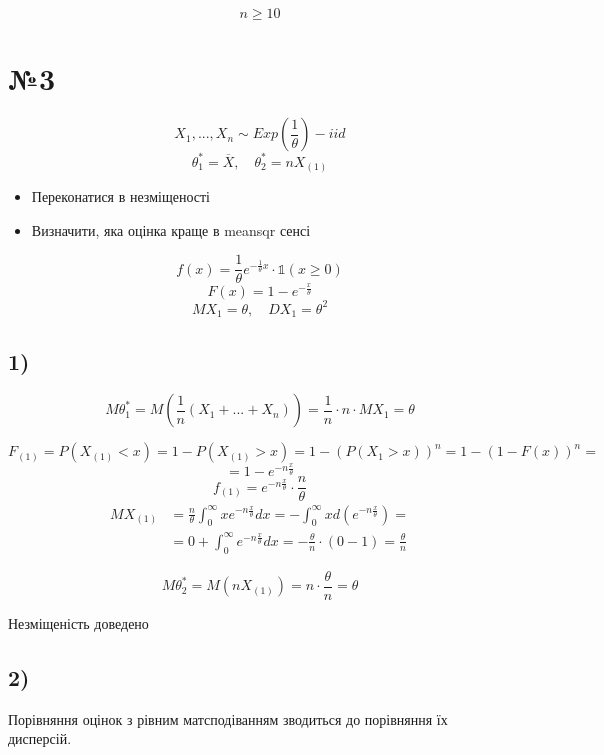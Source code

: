 \documentclass[11pt, a4paper]{article} %
\begin{document}
\begin{mdframed}[style=ans]
    $$n \ge 10$$
\end{mdframed}

\section*{№3}
\begin{mdframed}
    $$X_1,...,X_n \sim Exp\left(\frac{1}{\theta}\right) - iid$$
    $$\theta^*_1 = \overline X, \quad \theta^*_2 = nX_{(1)}$$

    \begin{itemize}
        \item Переконатися в незміщеності
        \item Визначити, яка оцінка краще в meansqr сенсі
    \end{itemize}
\end{mdframed}

$$f(x) = \frac{1}{\theta}e^{-\frac{1}{\theta}x} \cdot \mathbb{1}(x \ge 0)$$
$$F(x) = 1 - e^{-\frac{x}{\theta}}$$
$$MX_1 = \theta, \quad DX_1 = \theta^2$$

\subsection*{1)}
$$M\theta^*_1 = M\left(\frac{1}{n} (X_1 + ... + X_n)\right) = \frac{1}{n} \cdot n \cdot MX_1 = \theta$$

$$F_{(1)} = P(X_{(1)} < x) = 1 - P(X_{(1)} > x) = 1 - \left(P(X_1 > x)\right)^n = 1 - \left(1 - F(x)\right)^n =$$
$$= 1 - e^{-n\frac{x}{\theta}}$$
$$f_{(1)} = e^{-n\frac{x}{\theta}} \cdot \frac{n}{\theta}$$
\begin{align*}    
MX_{(1)} &= \frac{n}{\theta} \int_0^\infty x e^{-n\frac{x}{\theta}} dx 
=  -\int_0^\infty x d\left(e^{-n\frac{x}{\theta}}\right) = \\
&= 0 + \int_0^\infty e^{-n\frac{x}{\theta}} dx 
= -\frac{\theta}{n} \cdot (0-1) = \frac{\theta}{n}
\end{align*}

$$M\theta^*_2 = M\left(nX_{(1)}\right) = n \cdot \frac{\theta}{n} = \theta$$

\begin{mdframed}[style=ans]
    Незміщеність доведено
\end{mdframed}

\subsection*{2)}
Порівняння оцінок з рівним матсподіванням зводиться до порівняння їх дисперсій.
\end{document}
